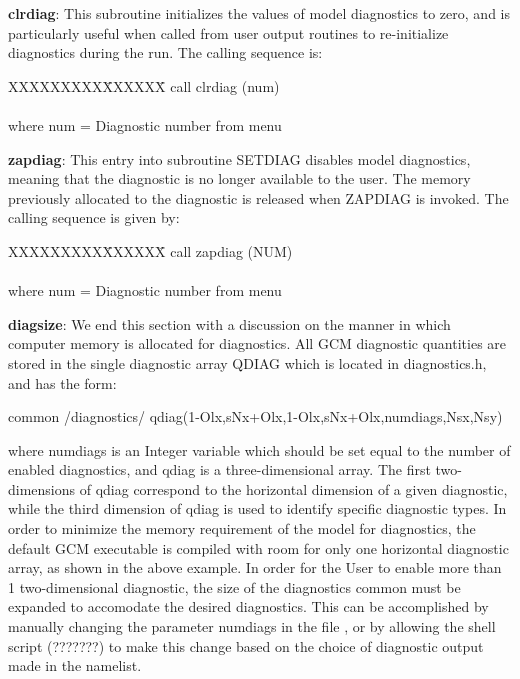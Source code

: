 {\bf clrdiag}:  This subroutine initializes the values of model diagnostics to zero, and is
particularly useful when called from user output routines to re-initialize diagnostics 
during the run.  The calling sequence is:

\begin{tabbing}
XXXXXXXXX\=XXXXXX\= \kill
\>        call clrdiag (num) \\
\\
where \>  num   \>= Diagnostic number from menu \\
\end{tabbing}

{\bf zapdiag}:  This entry into subroutine SETDIAG disables model diagnostics, meaning 
that the diagnostic is no longer available to the user.  The memory previously allocated 
to the diagnostic is released when ZAPDIAG is invoked.  The calling sequence is given by:

\begin{tabbing}
XXXXXXXXX\=XXXXXX\= \kill
\>        call zapdiag (NUM) \\
\\
where \>  num   \>= Diagnostic number from menu \\
\end{tabbing}

{\bf diagsize}:  We end this section with a discussion on the manner in which computer 
memory   is allocated for diagnostics.   All GCM diagnostic quantities are stored in the 
single diagnostic array QDIAG which is located in diagnostics.h, and has the form:

common /diagnostics/ qdiag(1-Olx,sNx+Olx,1-Olx,sNx+Olx,numdiags,Nsx,Nsy)

where numdiags is an Integer variable which should be
set equal to the number of enabled diagnostics, and qdiag is a three-dimensional
array.  The first two-dimensions of qdiag correspond to the horizontal dimension
of a given diagnostic, while the third dimension of qdiag is used to identify
specific diagnostic types.
In order to minimize the memory requirement of the model for diagnostics,
the default GCM executable is compiled with room for only one horizontal
diagnostic array, as shown in the above example.  
In order for the User to enable more than 1 two-dimensional diagnostic,
the size of the diagnostics common must be expanded to accomodate the desired diagnostics.
This can be accomplished by manually changing the parameter numdiags in the
file , or by allowing the 
shell script (???????) to make this
change based on the choice of diagnostic output made in the namelist.

